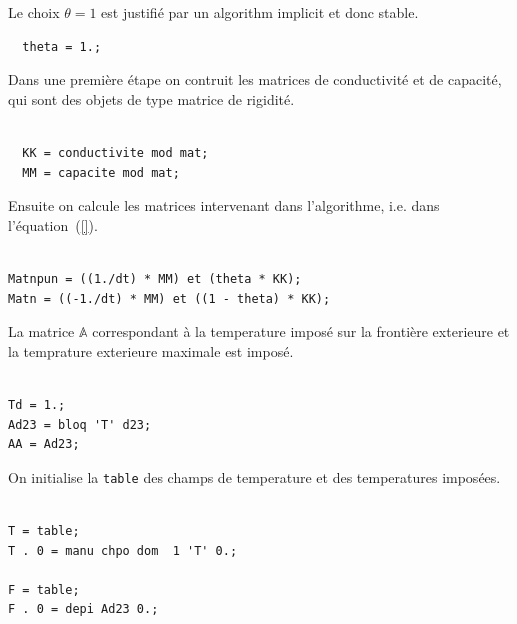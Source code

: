 \begin{castemcom}
Le choix  $\theta = 1$ est justifié par un algorithm implicit et donc stable.  
\end{castemcom}
\begin{castemlines}
\begin{verbatim}
  theta = 1.;
\end{verbatim}
\end{castemlines}

\begin{castemcom}
Dans une première étape on contruit les matrices de conductivité et de 
capacité, qui sont des objets de type matrice de rigidité.  
\end{castemcom}
\begin{castemlines}
\begin{verbatim}

  KK = conductivite mod mat; 
  MM = capacite mod mat;

\end{verbatim}
\end{castemlines}

\begin{castemcom}
Ensuite on calcule les matrices intervenant dans l'algorithme, i.e. dans 
l'équation~(\ref{}).
\end{castemcom}
\begin{castemlines}
\begin{verbatim}
  
Matnpun = ((1./dt) * MM) et (theta * KK); 
Matn = ((-1./dt) * MM) et ((1 - theta) * KK); 

\end{verbatim}
\end{castemlines}
 
\begin{castemcom}
La matrice $\mathbb{A}$ correspondant à la temperature 
imposé sur la frontière exterieure et la temprature 
exterieure maximale est imposé.
\end{castemcom}
\begin{castemlines}
\begin{verbatim}

Td = 1.;   
Ad23 = bloq 'T' d23;
AA = Ad23;

\end{verbatim}
\end{castemlines}
 
\begin{castemcom}
On initialise la \texttt{table} des champs 
de temperature et des temperatures imposées. 
\end{castemcom}
\begin{castemlines}
\begin{verbatim}

T = table; 
T . 0 = manu chpo dom  1 'T' 0.;

F = table;
F . 0 = depi Ad23 0.;

\end{verbatim}
\end{castemlines}
 
